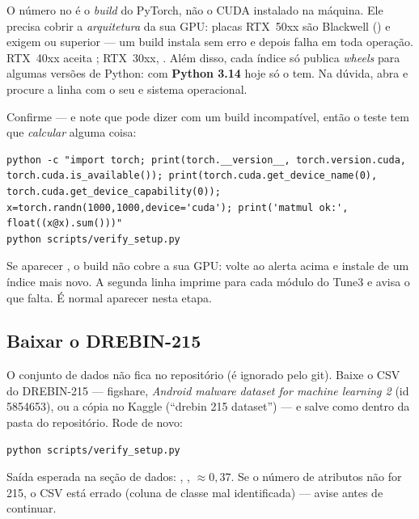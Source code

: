 \begin{alerta}
O número no  é o \emph{build} do PyTorch, não o CUDA instalado na máquina. Ele precisa cobrir a \emph{arquitetura} da sua GPU: placas RTX~50xx são Blackwell () e exigem  ou superior --- um build  instala sem erro e depois falha em toda operação. RTX~40xx aceita ; RTX~30xx, . Além disso, cada índice só publica \emph{wheels} para algumas versões de Python: com \textbf{Python 3.14} hoje só o  tem. Na dúvida, abra  e procure a linha com o seu  e sistema operacional.
\end{alerta}

Confirme --- e note que  pode dizer  com um build incompatível, então o teste tem que \emph{calcular} alguma coisa:
\begin{lstlisting}
python -c "import torch; print(torch.__version__, torch.version.cuda, torch.cuda.is_available()); print(torch.cuda.get_device_name(0), torch.cuda.get_device_capability(0)); x=torch.randn(1000,1000,device='cuda'); print('matmul ok:', float((x@x).sum()))"
python scripts/verify_setup.py
\end{lstlisting}
Se aparecer , o build não cobre a sua GPU: volte ao alerta acima e instale de um índice mais novo.
A segunda linha imprime \code{[ OK ]} para cada módulo do Tune3 e avisa o que falta. É normal aparecer  nesta etapa.

\subsection{Baixar o DREBIN-215}
O conjunto de dados não fica no repositório (é ignorado pelo git). Baixe o CSV do DREBIN-215 ---
figshare, \emph{Android malware dataset for machine learning 2} (id 5854653), ou a cópia no Kaggle (``drebin 215 dataset'') --- e salve como  dentro da pasta do repositório. Rode de novo:
\begin{lstlisting}
python scripts/verify_setup.py
\end{lstlisting}
Saída esperada na seção de dados: , ,  $\approx0{,}37$. Se o número de atributos não for 215, o CSV está errado (coluna de classe mal identificada) --- avise antes de continuar.

